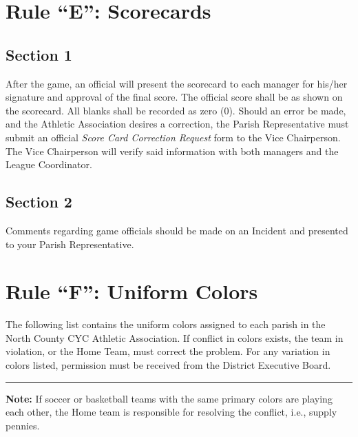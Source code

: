 \section{Rule ``E'': Scorecards}
\label{sec:rules-e}
\subsection{Section 1}
\label{ssec:rules-e-1}
After the game, an official will present the scorecard to each manager for his/her signature and approval of the final score. The official score shall be as shown on the scorecard.  All blanks shall be recorded as zero (0).  Should an error be made, and the Athletic Association desires a correction, the Parish Representative must submit an official {\em Score Card Correction Request} form to the Vice Chairperson.  The Vice Chairperson will verify said information with both managers and the League Coordinator.

\subsection{Section 2}
\label{ssec:rules-e-2}
Comments regarding game officials should be made on an Incident and presented to your Parish Representative.

\section{Rule ``F'': Uniform Colors}
The following list contains the uniform colors assigned to each parish in the North County CYC Athletic Association.  If conflict in colors exists, the team in violation, or the Home Team, must correct the problem.  For any variation in colors listed, permission must be received from the District Executive Board.
\plainbreak{1}
\textbf{Note:}  If soccer or basketball teams with the same primary colors are playing each other, the Home team is responsible for resolving the conflict, i.e., supply pennies.

